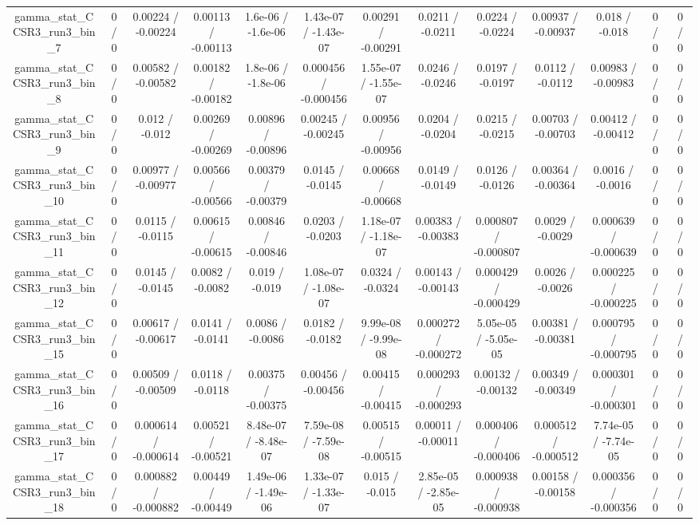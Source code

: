 \documentclass[10pt]{article}
\begin{document}
\begin{table}[htbp]
\begin{center}
\begin{tabular}{|c|c|c|c|c|c|c|c|c|c|c|c|c|}
  gamma_stat_CCSR3_run3_bin_7 & 0 / 0 & 0.00224 / -0.00224 & 0.00113 / -0.00113 & 1.6e-06 / -1.6e-06 & 1.43e-07 / -1.43e-07 & 0.00291 / -0.00291 & 0.0211 / -0.0211 & 0.0224 / -0.0224 & 0.00937 / -0.00937 & 0.018 / -0.018 & 0 / 0 & 0 / 0 \\ 
  gamma_stat_CCSR3_run3_bin_8 & 0 / 0 & 0.00582 / -0.00582 & 0.00182 / -0.00182 & 1.8e-06 / -1.8e-06 & 0.000456 / -0.000456 & 1.55e-07 / -1.55e-07 & 0.0246 / -0.0246 & 0.0197 / -0.0197 & 0.0112 / -0.0112 & 0.00983 / -0.00983 & 0 / 0 & 0 / 0 \\ 
  gamma_stat_CCSR3_run3_bin_9 & 0 / 0 & 0.012 / -0.012 & 0.00269 / -0.00269 & 0.00896 / -0.00896 & 0.00245 / -0.00245 & 0.00956 / -0.00956 & 0.0204 / -0.0204 & 0.0215 / -0.0215 & 0.00703 / -0.00703 & 0.00412 / -0.00412 & 0 / 0 & 0 / 0 \\ 
  gamma_stat_CCSR3_run3_bin_10 & 0 / 0 & 0.00977 / -0.00977 & 0.00566 / -0.00566 & 0.00379 / -0.00379 & 0.0145 / -0.0145 & 0.00668 / -0.00668 & 0.0149 / -0.0149 & 0.0126 / -0.0126 & 0.00364 / -0.00364 & 0.0016 / -0.0016 & 0 / 0 & 0 / 0 \\ 
  gamma_stat_CCSR3_run3_bin_11 & 0 / 0 & 0.0115 / -0.0115 & 0.00615 / -0.00615 & 0.00846 / -0.00846 & 0.0203 / -0.0203 & 1.18e-07 / -1.18e-07 & 0.00383 / -0.00383 & 0.000807 / -0.000807 & 0.0029 / -0.0029 & 0.000639 / -0.000639 & 0 / 0 & 0 / 0 \\ 
  gamma_stat_CCSR3_run3_bin_12 & 0 / 0 & 0.0145 / -0.0145 & 0.0082 / -0.0082 & 0.019 / -0.019 & 1.08e-07 / -1.08e-07 & 0.0324 / -0.0324 & 0.00143 / -0.00143 & 0.000429 / -0.000429 & 0.0026 / -0.0026 & 0.000225 / -0.000225 & 0 / 0 & 0 / 0 \\ 
  gamma_stat_CCSR3_run3_bin_15 & 0 / 0 & 0.00617 / -0.00617 & 0.0141 / -0.0141 & 0.0086 / -0.0086 & 0.0182 / -0.0182 & 9.99e-08 / -9.99e-08 & 0.000272 / -0.000272 & 5.05e-05 / -5.05e-05 & 0.00381 / -0.00381 & 0.000795 / -0.000795 & 0 / 0 & 0 / 0 \\ 
  gamma_stat_CCSR3_run3_bin_16 & 0 / 0 & 0.00509 / -0.00509 & 0.0118 / -0.0118 & 0.00375 / -0.00375 & 0.00456 / -0.00456 & 0.00415 / -0.00415 & 0.000293 / -0.000293 & 0.00132 / -0.00132 & 0.00349 / -0.00349 & 0.000301 / -0.000301 & 0 / 0 & 0 / 0 \\ 
  gamma_stat_CCSR3_run3_bin_17 & 0 / 0 & 0.000614 / -0.000614 & 0.00521 / -0.00521 & 8.48e-07 / -8.48e-07 & 7.59e-08 / -7.59e-08 & 0.00515 / -0.00515 & 0.00011 / -0.00011 & 0.000406 / -0.000406 & 0.000512 / -0.000512 & 7.74e-05 / -7.74e-05 & 0 / 0 & 0 / 0 \\ 
  gamma_stat_CCSR3_run3_bin_18 & 0 / 0 & 0.000882 / -0.000882 & 0.00449 / -0.00449 & 1.49e-06 / -1.49e-06 & 1.33e-07 / -1.33e-07 & 0.015 / -0.015 & 2.85e-05 / -2.85e-05 & 0.000938 / -0.000938 & 0.00158 / -0.00158 & 0.000356 / -0.000356 & 0 / 0 & 0 / 0 \\ 

\end{tabular}
\end{center}
\end{table}
\end{document}

